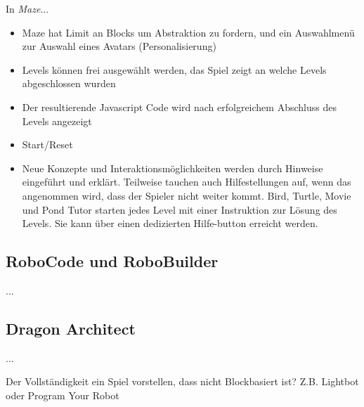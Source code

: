 In \emph{Maze}...

\begin{itemize}
\item Maze hat Limit an Blocks um Abstraktion zu fordern, und ein Auswahlmenü zur Auswahl eines Avatars
(Personalisierung)
\item Levels können frei ausgewählt werden, das Spiel zeigt an welche Levels abgeschlossen wurden
\item Der resultierende Javascript Code wird nach erfolgreichem Abschluss des Levels angezeigt
\item Start/Reset
\item Neue Konzepte und Interaktionsmöglichkeiten werden durch Hinweise eingeführt und erklärt. Teilweise
tauchen auch Hilfestellungen auf, wenn das angenommen wird, dass der Spieler nicht weiter kommt.
Bird, Turtle, Movie und Pond Tutor starten jedes Level mit einer Instruktion zur Lösung des Levels.
Sie kann über einen dedizierten Hilfe-button erreicht werden.
\end{itemize}

\subsection{RoboCode und RoboBuilder}

...

\subsection{Dragon Architect}

...

Der Vollständigkeit ein Spiel vorstellen, dass nicht Blockbasiert ist? Z.B. Lightbot oder Program
Your Robot

